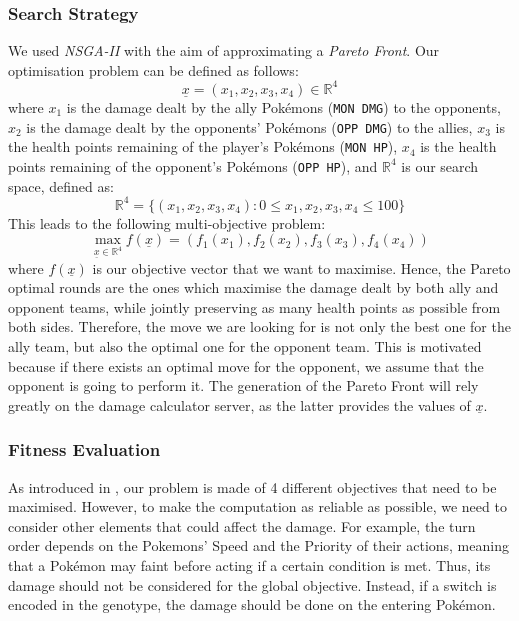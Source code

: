 \subsubsection{Search Strategy}
\label{subsec:search}
We used \emph{NSGA-II} with the aim of approximating a \emph{Pareto Front}. Our optimisation problem can be defined as follows:
\begin{equation*}
    \underline{x} = (x_1,x_2,x_3,x_4) \in \mathbb{R}^4
\end{equation*}
where $x_1$ is the damage dealt by the ally Pokémons (\texttt{MON DMG}) to the opponents, $x_2$ is the damage dealt by the opponents' Pokémons (\texttt{OPP DMG}) to the allies, $x_3$ is the health points remaining of the player's Pokémons (\texttt{MON HP}), $x_4$ is the health points remaining of the opponent's Pokémons (\texttt{OPP HP}), and $\mathbb{R}^4$ is our search space, defined as:
\begin{equation*}
    \mathbb{R}^4 = \{(x_1,x_2,x_3,x_4) : 0 \leq x_1,x_2,x_3,x_4 \leq 100\}
\end{equation*}
This leads to the following multi-objective problem:
\begin{equation*}
    \max_{\underline{x} \in \mathbb{R}^4} f(\underline{x}) = (f_1(x_1),f_2(x_2),f_3(x_3),f_4(x_4))
\end{equation*}
where $f(\underline{x})$ is our objective vector that we want to maximise. 
Hence, the Pareto optimal rounds are the ones which maximise the damage dealt by both ally and opponent teams, while jointly preserving as many health points as possible from both sides. Therefore, the move we are looking for is not only the best one for the ally team, but also the optimal one for the opponent team. This is motivated because if there exists an optimal move for the opponent, we assume that the opponent is going to perform it. The generation of the Pareto Front will rely greatly on the damage calculator server, as the latter provides the values of $\underline{x}$.

\subsubsection{Fitness Evaluation}
As introduced in , our problem is made of 4 different objectives that need to be maximised. However, to make the computation as reliable as possible, we need to consider other elements that could affect the damage. For example, the turn order depends on the Pokemons' Speed and the Priority of their actions, meaning that a Pokémon may faint before acting if a certain condition is met. Thus, its damage should not be considered for the global objective. Instead, if a switch is encoded in the genotype, the damage should be done on the entering Pokémon.

